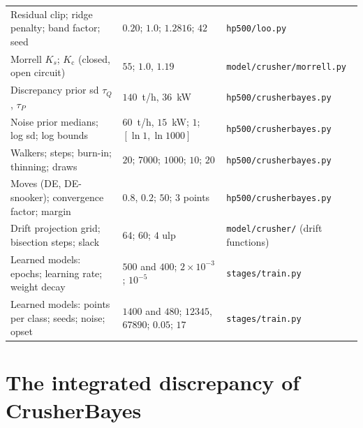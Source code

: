\begin{table}[!t]
\begin{tabular}{@{}l l l@{}}
Residual clip; ridge penalty; band factor; seed & $0.20$; $1.0$; $1.2816$; $42$ & \texttt{hp500/\allowbreak{}loo.py} \\
Morrell $K_s$; $K_{\mathrm c}$ (closed, open circuit) & $55$; $1.0$, $1.19$ & \texttt{model/\allowbreak{}crusher/\allowbreak{}morrell.py} \\
Discrepancy prior sd $\tau_Q$, $\tau_P$ & $140$~t/h, $36$~kW & \texttt{hp500/\allowbreak{}crusherbayes.py} \\
Noise prior medians; log sd; log bounds & $60$~t/h, $15$~kW; $1$; $[\ln1, \ln1000]$ & \texttt{hp500/\allowbreak{}crusherbayes.py} \\
Walkers; steps; burn-in; thinning; draws & $20$; $7000$; $1000$; $10$; $20$ & \texttt{hp500/\allowbreak{}crusherbayes.py} \\
Moves (DE, DE-snooker); convergence factor; margin & $0.8$, $0.2$; $50$; $3$ points & \texttt{hp500/\allowbreak{}crusherbayes.py} \\
Drift projection grid; bisection steps; slack & $64$; $60$; $4$ ulp & \texttt{model/\allowbreak{}crusher/} (drift functions) \\
Learned models: epochs; learning rate; weight decay & $500$ and $400$; $2\times10^{-3}$; $10^{-5}$ & \texttt{stages/\allowbreak{}train.py} \\
Learned models: points per class; seeds; noise; opset & $1400$ and $480$; $12345$, $67890$; $0.05$; $17$ & \texttt{stages/\allowbreak{}train.py} \\
\bottomrule
\end{tabular}
\end{table}

\section{The integrated discrepancy of CrusherBayes}\label{app:derivation}


